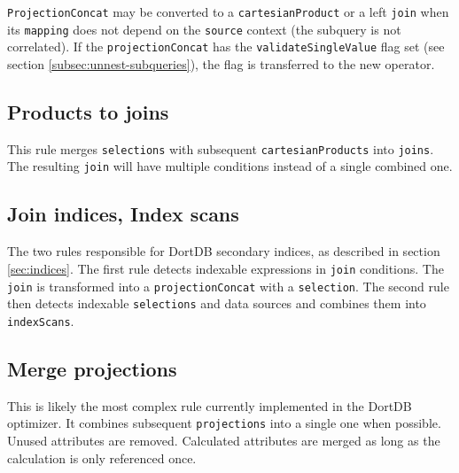 \texttt{ProjectionConcat} may be converted to a \texttt{cartesianProduct} or a left \texttt{join} when its \texttt{mapping} does not depend on the \texttt{source} context (the subquery is not correlated). If the \texttt{projectionConcat} has the \texttt{validateSingleValue} flag set (see section \ref{subsec:unnest-subqueries}), the flag is transferred to the new operator.

\subsection{Products to joins}

This rule merges \texttt{selections} with subsequent \texttt{cartesianProducts} into \texttt{joins}. The resulting \texttt{join} will have multiple conditions instead of a single combined one.

\subsection{Join indices, Index scans}

The two rules responsible for DortDB secondary indices, as described in section \ref{sec:indices}. The first rule detects indexable expressions in \texttt{join} conditions. The \texttt{join} is transformed into a \texttt{projectionConcat} with a \texttt{selection}. The second rule then detects indexable \texttt{selections} and data sources and combines them into \texttt{indexScans}.

\subsection{Merge projections}

This is likely the most complex rule currently implemented in the DortDB optimizer. It combines subsequent \texttt{projections} into a single one when possible. Unused attributes are removed. Calculated attributes are merged as long as the calculation is only referenced once.

